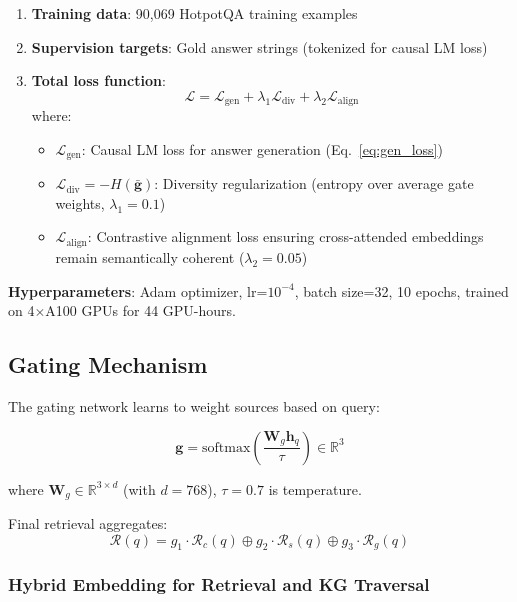\documentclass[10pt,twocolumn]{article}
\begin{document}
\begin{enumerate}
    \item \textbf{Training data}: 90,069 HotpotQA training examples
    
    \item \textbf{Supervision targets}: Gold answer strings (tokenized for causal LM loss)
    
    \item \textbf{Total loss function}:
    \begin{equation}
    \mathcal{L} = \mathcal{L}_{\text{gen}} + \lambda_1 \mathcal{L}_{\text{div}} + \lambda_2 \mathcal{L}_{\text{align}}
    \end{equation}
    where:
    \begin{itemize}
        \item $\mathcal{L}_{\text{gen}}$: Causal LM loss for answer generation (Eq.~\ref{eq:gen_loss})
        \item $\mathcal{L}_{\text{div}} = -H(\bar{\mathbf{g}})$: Diversity regularization (entropy over average gate weights, $\lambda_1=0.1$)
        \item $\mathcal{L}_{\text{align}}$: Contrastive alignment loss ensuring cross-attended embeddings remain semantically coherent ($\lambda_2=0.05$)
    \end{itemize}
\end{enumerate}

\textbf{Hyperparameters}: Adam optimizer, lr=$10^{-4}$, batch size=32, 10 epochs, trained on 4$\times$A100 GPUs for 44 GPU-hours.


\subsection{Gating Mechanism}
\label{sec:gating}

The gating network learns to weight sources based on query:

\begin{equation}
\mathbf{g} = \text{softmax}\left( \frac{\mathbf{W}_g \mathbf{h}_q}{\tau} \right) \in \mathbb{R}^3
\end{equation}

where $\mathbf{W}_g \in \mathbb{R}^{3 \times d}$ (with $d=768$), $\tau=0.7$ is temperature.

Final retrieval aggregates:
\begin{equation}
\mathcal{R}(q) = g_1 \cdot \mathcal{R}_c(q) \oplus g_2 \cdot \mathcal{R}_s(q) \oplus g_3 \cdot \mathcal{R}_g(q)
\end{equation}


\subsubsection{Hybrid Embedding for Retrieval and KG Traversal}
\end{document}
